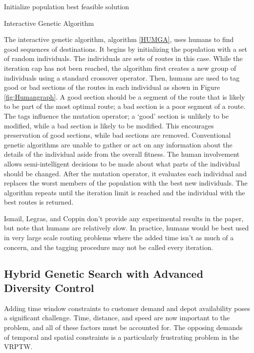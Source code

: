 \documentclass{sig-alternate}
\begin{document}
\begin{algorithm}[t]
Initialize population\;
\Return best feasible solution\;
\caption{Interactive Genetic Algorithm\label{HUMGA}}
\end{algorithm}

The interactive genetic algorithm, algorithm \ref{HUMGA}, uses humans to find good sequences of destinations. It begins by initializing the population with a set of random individuals. The individuals are sets of routes in this case. While the iteration cap has not been reached, the algorithm first creates a new group of individuals using a standard crossover operator. Then, humans are used to tag good or bad sections of the routes in each individual as shown in Figure \ref{fig:Humangraph}. A good section should be a segment of the route that is likely to be part of the most optimal route; a bad section is a poor segment of a route. The tags influence the mutation operator; a `good' section is unlikely to be modified, while a bad section is likely to be modified. This encourages preservation of good sections, while bad sections are removed. Conventional genetic algorithms are unable to gather or act on any information about the details of the individual aside from the overall fitness. The human involvement allows semi-intelligent decisions to be made about what parts of the individual should be changed. After the mutation operator, it evaluates each individual and replaces the worst members of the population with the best new individuals. The algorithm repeats until the iteration limit is reached and the individual with the best routes is returned. 

Ismail, Legras, and Coppin don't provide any experimental results in the paper, but note that humans are relatively slow. In practice, humans would be best used in very large scale routing problems where the added time isn't as much of a concern, and the tagging procedure may not be called every iteration. 

\subsection{Hybrid Genetic Search with Advanced Diversity Control}
Adding time window constraints to customer demand and depot availability poses a significant challenge. Time, distance, and speed are now important to the problem, and all of these factors must be accounted for. The opposing demands of temporal and spatial constraints is a particularly frustrating problem in the VRPTW. 
\end{document}

